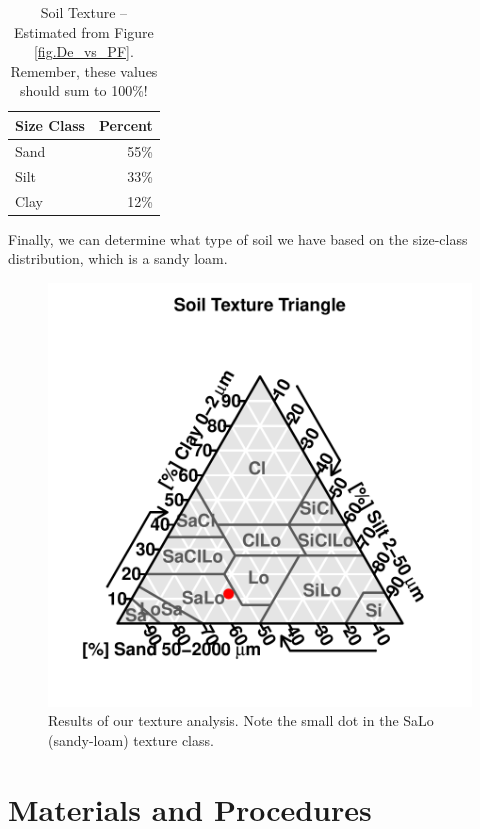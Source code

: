 \documentclass{tufte-handout}
\begin{document}
\begin{table}

		\begin{tabular}{lr}\hline
Size Class 	&		Percent		\\ \hline\hline
Sand				& 	55\% \\
Silt				&   33\% \\
Clay				& 	12\% \\ \hline		
		\end{tabular}
	\caption{Soil Texture -- Estimated from Figure \ref{fig.De_vs_PF}. Remember, these values should sum to 100\%!}
	\label{tab:SoilTexture}
\end{table}

Finally, we can determine what type of soil we have based on the size-class distribution, which is a sandy loam. 


\begin{figure}
\includegraphics{Soil_Texture_Analysis_160528-TTPlot}
\caption{Results of our texture analysis. Note the small dot in the SaLo (sandy-loam) texture class.}
\label{fig.simplifiedfig}
\end{figure}



\clearpage
\section{Materials and Procedures}
\end{document}
